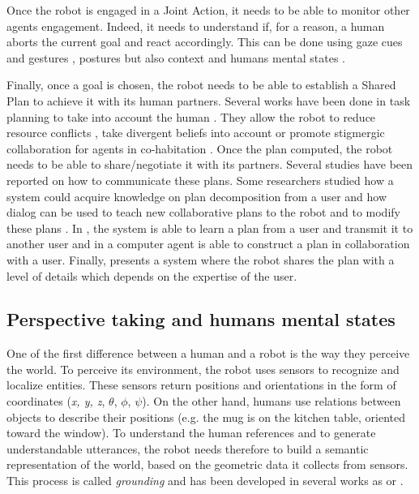 \documentclass[english,a4paper,11pt,twoside]{StyleThese}
\begin{document}
Once the robot is engaged in a Joint Action, it needs to be able to monitor other agents engagement. Indeed, it needs to understand if, for a reason, a human aborts the current goal and react accordingly. This can be done using gaze cues and gestures \cite{rich2010recognizing}, postures \cite{sanghvi2011automatic} but also context and humans mental states \cite{salam2015multi}.

Finally, once a goal is chosen, the robot needs to be able to establish a Shared Plan to achieve it with its human partners. Several works have been done in task planning to take into account the human \cite{cirillo2010human,Lallement2014hatp}. They allow the robot to reduce resource conflicts \cite{chakraborti2016planning}, take divergent beliefs into account \cite{guitton2012belief,talamadupula2014coordination} or promote stigmergic collaboration
for agents in co-habitation \cite{chakraborti2015planning}. 
Once the plan computed, the robot needs to be able to share/negotiate it with its partners. Several studies have been reported on how to communicate these plans. Some researchers studied how a system could acquire knowledge on plan decomposition from a user \cite{Mohseni2015} and how dialog can be used to teach new collaborative plans to the robot and to modify these plans \cite{petit2013coordinating}. In \cite{sorce2015proof}, the system is able to learn a plan from a user and transmit it to another user and in \cite{allen2002human} a computer agent is able to construct a plan in collaboration with a user. Finally, \cite{milliez2016using} presents a system where the robot shares the plan with a level of details which depends on the expertise of the user.

\subsection{Perspective taking and humans mental states}

\label{subsec:perspective_taking}

One of the first difference between a human and a robot is the way they perceive the world. To perceive its environment, the robot uses sensors to recognize and localize entities. These sensors return positions and orientations in the form of coordinates (\textit{x, y, z}, $\theta$, $\phi$, $\psi$). On the other hand, humans use relations between objects to describe their positions (e.g. the mug is on the kitchen table, oriented toward the window). To understand the human references and to
generate understandable utterances, the robot needs therefore
to build a semantic representation of the world, based on the
geometric data it collects from sensors. This process is called \textit{grounding} and has been developed in several works as \cite{mavridis2005grounded} or \cite{lemaignan2012grounding}.
\end{document}
